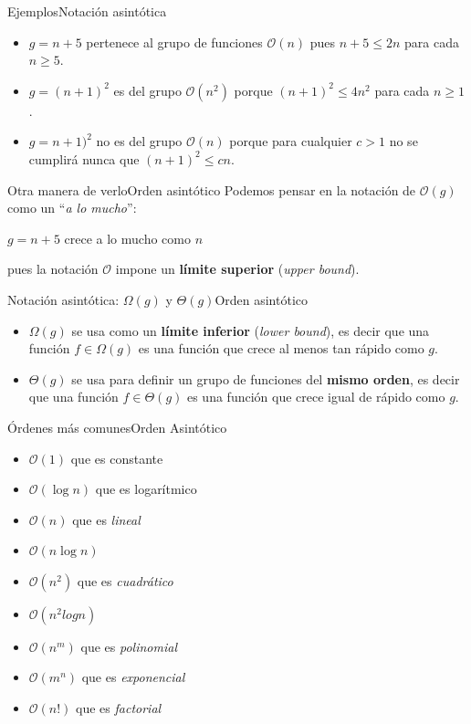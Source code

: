 \documentclass[spanish, c]{beamer}
\newcommand{\bigO}{\mathcal{O}}
\begin{document}
\begin{frame}{Ejemplos}{Notación asintótica}
    \begin{itemize}
        \itemsep3ex
        \item $g = n +5$ pertenece al grupo de funciones $\bigO(n)$ pues $n+5 \leq 2n$ para cada $n \geq 5$.
        \item $g = (n+1)^2$ es del grupo $\bigO(n^2)$ porque $(n+1)^2 \leq 4n^2$ para cada $n \geq 1$.
        \item $g = n+1)^2$ no es del grupo $\bigO(n)$ porque para cualquier $c > 1$ no se cumplirá nunca que $(n+1)^2 \leq cn$.
    \end{itemize}
\end{frame}

\begin{frame}{Otra manera de verlo}{Orden asintótico}
    Podemos pensar en la notación de $\bigO(g)$  como un ``\textit{a lo mucho}'': \pause
    \bigskip
    \begin{center}
        $g = n + 5$ crece \alert{a lo mucho} como $n$
    \end{center} \pause
    \bigskip
    pues la notación $\bigO$ impone un \textbf{límite superior} (\textit{upper bound}).
\end{frame}

\begin{frame}{Notación asintótica: $\Omega(g)$ y $\Theta(g)$}{Orden asintótico}
    \begin{itemize}
        \itemsep3.5ex
        \item $\Omega(g)$ se usa como un \textbf{límite inferior} (\textit{lower bound}), es decir que una función $f \in \Omega(g)$ es una función que crece \alert{al menos} tan rápido como $g$.
        \item $\Theta(g)$ se usa para definir un grupo de funciones del \textbf{mismo orden}, es decir que una función $f \in \Theta(g)$ es una función que crece \alert{igual} de rápido como $g$.
    \end{itemize}
\end{frame}

\begin{frame}{Órdenes más comunes}{Orden Asintótico}
    \begin{itemize}
        \item $\bigO(1)$ que es constante
        \item $\bigO(\log n)$ que es logarítmico
        \item $\bigO(n)$ que es \textit{lineal}
        \item $\bigO(n \log n)$
        \item $\bigO(n^2)$ que es \textit{cuadrático}
        \item $\bigO(n^2 log n)$
        \item $\bigO(n^m)$ que es \textit{polinomial}
        \item $\bigO(m^n)$ que es \textit{exponencial}
        \item $\bigO(n!)$ que es \textit{factorial}
    \end{itemize}
\end{frame}
\end{document}
